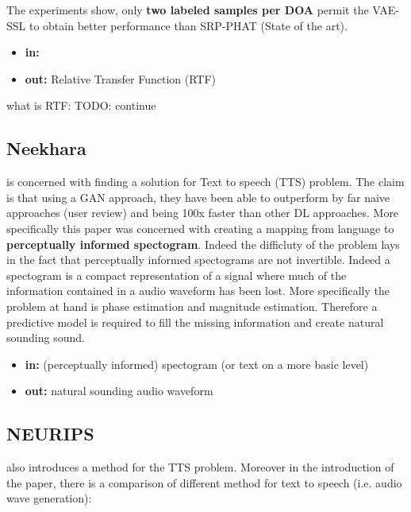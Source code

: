 \documentclass{article}
\begin{document}
The experiments show, only \textbf{two labeled samples per DOA} permit the VAE-SSL to obtain better performance than SRP-PHAT (State of the art).

\begin{itemize}
    \item \textbf{in:} 
    \item \textbf{out:} Relative Transfer Function (RTF)
\end{itemize}
what is RTF: TODO: continue

\subsection{Neekhara}

\cite{neekhara2019expediting} is concerned with finding a solution for Text to speech (TTS) problem. The claim is that using a GAN approach, they have been able to outperform by far naive approaches (user review) and being 100x faster than other DL approaches. More specifically this paper was concerned with creating a mapping from language to \textbf{perceptually informed spectogram}. Indeed the difficluty of the problem lays in the fact that perceptually informed spectograms are not invertible. Indeed a spectogram is a compact representation of a signal where much of the information contained in a audio waveform has been lost. More specifically the problem at hand is phase estimation and magnitude estimation. Therefore a predictive model is required to fill the missing information and create natural sounding sound.

\begin{itemize}
    \item \textbf{in:} (perceptually informed) spectogram (or text on a more basic level)
    \item \textbf{out:} natural sounding audio waveform
\end{itemize}

\subsection{NEURIPS}

\cite{NEURIPS2019_6804c9bc} also introduces a method for the TTS problem. Moreover in the introduction of the paper, there is a comparison of different method for text to speech (i.e. audio wave generation):
\end{document}
